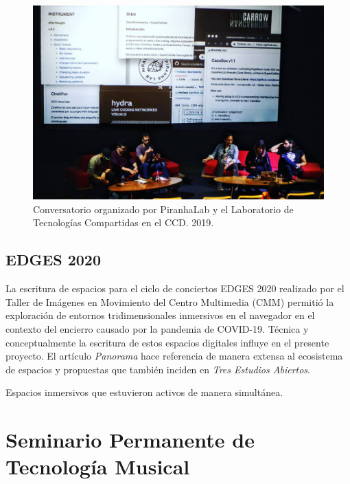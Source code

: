 \begin{figure}[tb]
\centering 
\includegraphics[width=\columnwidth]{../img/conversatorio.jpg} 
\caption[Conversatorio CCD]{Conversatorio organizado por PiranhaLab y el Laboratorio de Tecnologías Compartidas en el CCD. 2019.} %
\label{fig:gallery} 
\end{figure}

\subsection{EDGES 2020}

La escritura de espacios para el ciclo de conciertos EDGES 2020 realizado por el Taller de Imágenes en Movimiento del Centro Multimedia (CMM) permitió la exploración de entornos tridimensionales inmersivos en el navegador en el contexto del encierro causado por la pandemia de COVID-19. Técnica y conceptualmente la escritura de estos espacios digitales influye en el presente proyecto. El artículo \textit{Panorama} \citep{panoramaArticulo} hace referencia de manera extensa al ecosistema de espacios y propuestas que también inciden en \textit{Tres Estudios Abiertos}.


Espacios inmersivos que estuvieron activos de manera simultánea. 

\section{Seminario Permanente de Tecnología Musical} 

